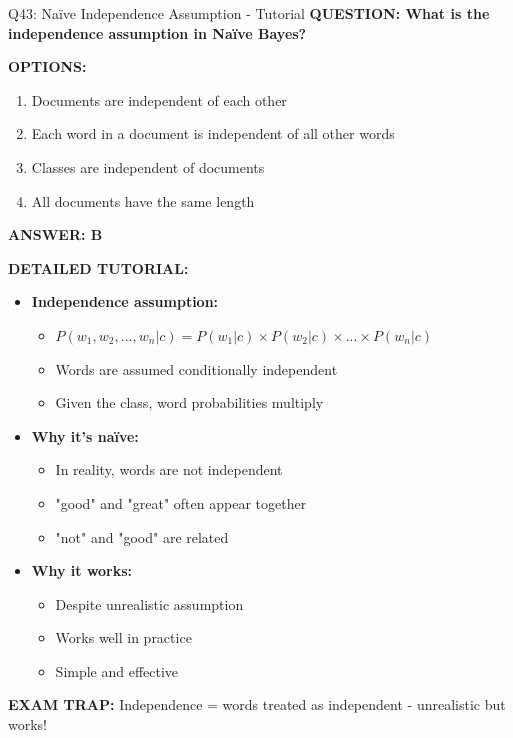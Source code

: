 \documentclass[8pt]{beamer}
\begin{document}
	\begin{frame}{Q43: Naïve Independence Assumption - Tutorial}
		\fontsize{6.5}{7.5}\selectfont
		\textbf{QUESTION: What is the independence assumption in Naïve Bayes?}
		
		\vspace{0.1cm}
		\textbf{OPTIONS:}
		\begin{enumerate}
			\item Documents are independent of each other
			\item Each word in a document is independent of all other words
			\item Classes are independent of documents
			\item All documents have the same length
		\end{enumerate}
		
		\vspace{0.1cm}
		\textcolor{myblue}{\textbf{ANSWER: B}}
		
		\vspace{0.1cm}
		\textbf{DETAILED TUTORIAL:}
		\begin{itemize}
			\item \textbf{Independence assumption:}
			\begin{itemize}
				\item $P(w_1, w_2, ..., w_n | c) = P(w_1|c) \times P(w_2|c) \times ... \times P(w_n|c)$
				\item Words are assumed conditionally independent
				\item Given the class, word probabilities multiply
			\end{itemize}
			\item \textbf{Why it's naïve:}
			\begin{itemize}
				\item In reality, words are not independent
				\item "good" and "great" often appear together
				\item "not" and "good" are related
			\end{itemize}
			\item \textbf{Why it works:}
			\begin{itemize}
				\item Despite unrealistic assumption
				\item Works well in practice
				\item Simple and effective
			\end{itemize}
		\end{itemize}
		
		\textcolor{myred}{\textbf{EXAM TRAP:}} Independence = \textcolor{myblue}{words treated as independent} - unrealistic but works!
	\end{frame}
	
\end{document}
